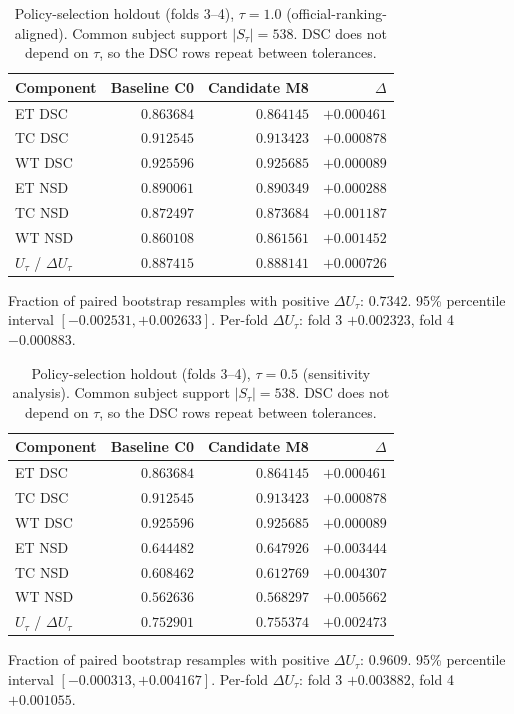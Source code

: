 \documentclass[runningheads]{llncs}
\begin{document}
\begin{table}[htbp]\centering
\caption{Policy-selection holdout (folds 3--4), $\tau=1.0$ (official-ranking-aligned). Common subject support $|S_\tau|=538$. DSC does not
depend on $\tau$, so the DSC rows repeat between tolerances.}
\begin{tabular}{@{}lrrr@{}}
\toprule
Component & Baseline C0 & Candidate M8 & $\Delta$ \\
\midrule
ET DSC & $0.863684$ & $0.864145$ & $+0.000461$ \\
TC DSC & $0.912545$ & $0.913423$ & $+0.000878$ \\
WT DSC & $0.925596$ & $0.925685$ & $+0.000089$ \\
ET NSD & $0.890061$ & $0.890349$ & $+0.000288$ \\
TC NSD & $0.872497$ & $0.873684$ & $+0.001187$ \\
WT NSD & $0.860108$ & $0.861561$ & $+0.001452$ \\
\midrule
$U_\tau$ / $\Delta U_\tau$ & $0.887415$ & $0.888141$ & $+0.000726$ \\
\bottomrule
\end{tabular}
\par\medskip
\begin{minipage}{0.92\textwidth}\small Fraction of paired bootstrap resamples with positive $\Delta U_\tau$: $0.7342$. 95\% percentile interval $[-0.002531,+0.002633]$. Per-fold $\Delta U_\tau$: fold 3 $+0.002323$, fold 4 $-0.000883$.\end{minipage}
\end{table}

\begin{table}[htbp]\centering
\caption{Policy-selection holdout (folds 3--4), $\tau=0.5$ (sensitivity analysis). Common subject support $|S_\tau|=538$. DSC does not
depend on $\tau$, so the DSC rows repeat between tolerances.}
\begin{tabular}{@{}lrrr@{}}
\toprule
Component & Baseline C0 & Candidate M8 & $\Delta$ \\
\midrule
ET DSC & $0.863684$ & $0.864145$ & $+0.000461$ \\
TC DSC & $0.912545$ & $0.913423$ & $+0.000878$ \\
WT DSC & $0.925596$ & $0.925685$ & $+0.000089$ \\
ET NSD & $0.644482$ & $0.647926$ & $+0.003444$ \\
TC NSD & $0.608462$ & $0.612769$ & $+0.004307$ \\
WT NSD & $0.562636$ & $0.568297$ & $+0.005662$ \\
\midrule
$U_\tau$ / $\Delta U_\tau$ & $0.752901$ & $0.755374$ & $+0.002473$ \\
\bottomrule
\end{tabular}
\par\medskip
\begin{minipage}{0.92\textwidth}\small Fraction of paired bootstrap resamples with positive $\Delta U_\tau$: $0.9609$. 95\% percentile interval $[-0.000313,+0.004167]$. Per-fold $\Delta U_\tau$: fold 3 $+0.003882$, fold 4 $+0.001055$.\end{minipage}
\end{table}
\end{document}
